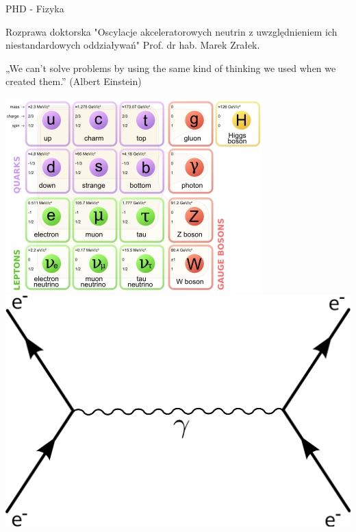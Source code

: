 \documentclass{beamer}
\begin{document}
\begin{frame}{PHD - Fizyka}
\begin{block}{Rozprawa doktorska}
"Oscylacje akceleratorowych neutrin z uwzględnieniem ich niestandardowych oddziaływań" Prof. dr hab. Marek Zrałek.

{\tiny „We can’t solve problems by using the same kind of thinking we used when we created them.” (Albert Einstein)}
\end{block}
\includegraphics[scale=0.4]{sm}\includegraphics[scale=0.05]{feydiag}

\end{frame}
\end{document}
